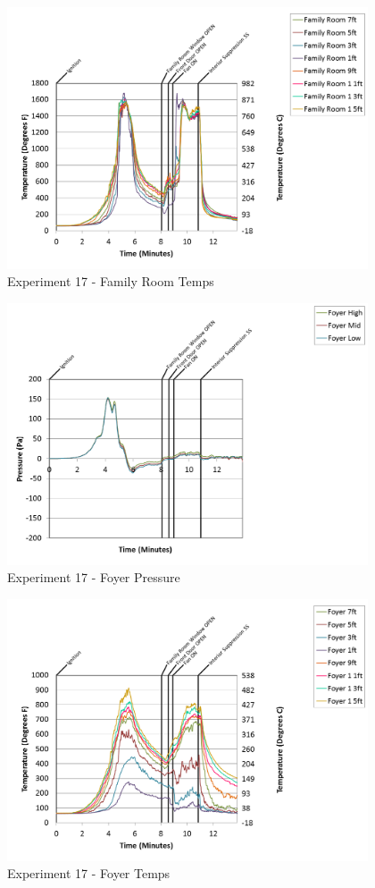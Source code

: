 \documentclass{article}
\begin{document}
\begin{appendices}
\clearpage

\begin{figure}[h!]
	\centering
	\includegraphics[height=3.05in]{0_Images/Results_Charts/Exp_17_Charts/FamilyRoomTemps.png}
	\caption{Experiment 17 - Family Room Temps}
\end{figure}


\begin{figure}[h!]
	\centering
	\includegraphics[height=3.05in]{0_Images/Results_Charts/Exp_17_Charts/FoyerPressure.png}
	\caption{Experiment 17 - Foyer Pressure}
\end{figure}

\clearpage

\begin{figure}[h!]
	\centering
	\includegraphics[height=3.05in]{0_Images/Results_Charts/Exp_17_Charts/FoyerTemps.png}
	\caption{Experiment 17 - Foyer Temps}
\end{figure}



\end{appendices}
\end{document}
